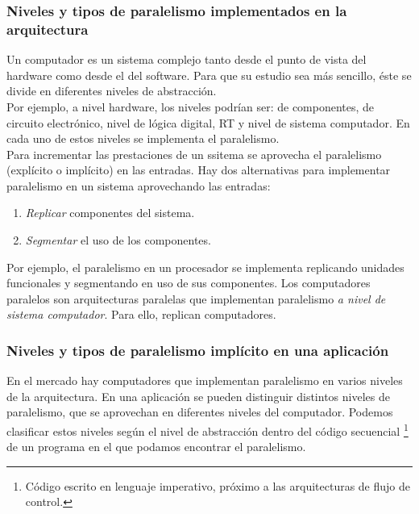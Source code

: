 \documentclass[12pt,spanish]{article}
\begin{document}
\subsubsection{Niveles y tipos de paralelismo implementados en la arquitectura}
Un computador es un sistema complejo tanto desde el punto de vista del hardware como desde el del software.
Para que su estudio sea más sencillo, éste se divide en diferentes niveles de abstracción.\\
Por ejemplo, a nivel hardware, los niveles podrían ser: de componentes, de circuito electrónico, nivel de lógica digital, RT y nivel de sistema computador. En cada uno de estos niveles se implementa el paralelismo. \\
Para incrementar las prestaciones de un ssitema se aprovecha el paralelismo (explícito o implícito) en las entradas. Hay dos alternativas para implementar paralelismo en un sistema aprovechando las entradas:
\begin{enumerate}
\item \textit{Replicar} componentes del sistema.
\item \textit{Segmentar} el uso de los componentes.
\end{enumerate}
Por ejemplo, el paralelismo en un procesador se implementa replicando unidades funcionales y segmentando en uso de sus componentes. Los computadores paralelos son arquitecturas paralelas que implementan paralelismo \emph{a nivel de sistema computador}. Para ello, replican computadores.

\subsubsection{Niveles y tipos de paralelismo implícito en una aplicación}

En el mercado hay computadores que implementan paralelismo en varios niveles de la arquitectura. En una aplicación se pueden distinguir distintos niveles de paralelismo, que se aprovechan en diferentes niveles del computador. Podemos clasificar estos niveles según el nivel de abstracción dentro del código secuencial \footnote{Código escrito en lenguaje imperativo, próximo a las arquitecturas de flujo de control.} de un programa en el que podamos encontrar el paralelismo.
\end{document}
